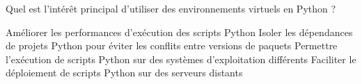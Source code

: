 \documentclass[french,a4paper,addpoints,11pt]{exam}
\begin{document}
\begin{questions}
    \question

    Quel est l'intérêt principal d'utiliser des environnements virtuels en Python ?

    \begin{checkboxes}
        \choice Améliorer les performances d'exécution des scripts Python
        \CorrectChoice Isoler les dépendances de projets Python pour éviter les conflits entre versions de paquets
        \choice Permettre l'exécution de scripts Python sur des systèmes d'exploitation différents
        \choice Faciliter le déploiement de scripts Python sur des serveurs distants
    \end{checkboxes}
\end{questions}
\end{document}
